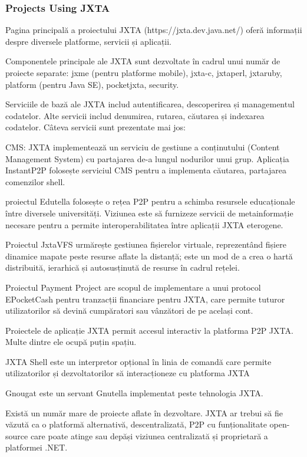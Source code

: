 \subsubsection{Projects Using JXTA}

Pagina principală a proiectului JXTA (https://jxta.dev.java.net/) oferă
informații despre diversele platforme, servicii și aplicații.

Componentele principale ale JXTA sunt dezvoltate în cadrul unui număr de
proiecte separate: jxme (pentru platforme mobile), jxta-c, jxtaperl, jxtaruby,
platform (pentru Java SE), pocketjxta, security.

Serviciile de bază ale JXTA includ autentificarea, descoperirea și
managementul codatelor. Alte servicii includ denumirea, rutarea, căutarea și
indexarea codatelor. Câteva servicii sunt prezentate mai jos:

CMS: JXTA implementează un serviciu de gestiune a conținutului (Content
Management System) cu partajarea de-a lungul nodurilor unui grup. Aplicația
InstantP2P folosește serviciul CMS pentru a implementa căutarea, partajarea
comenzilor shell.

proiectul Edutella folosește o rețea P2P pentru a schimba resursele
educaționale între diversele universități. Viziunea este să furnizeze servicii
de metainformație necesare pentru a permite interoperabilitatea între
aplicații JXTA eterogene.

Proiectul JxtaVFS urmărește gestiunea fișierelor virtuale, reprezentând
fișiere dinamice mapate peste resurse aflate la distanță; este un mod de a
crea o hartă distribuită, ierarhică și autosusținută de resurse în cadrul
rețelei.

Proiectul Payment Project are scopul de implementare a unui protocol
EPocketCash pentru tranzacții financiare pentru JXTA, care permite tuturor
utilizatorilor să devină cumpăratori sau vânzători de pe același cont.

Proiectele de aplicație JXTA permit accesul interactiv la platforma P2P JXTA.
Multe dintre ele ocupă puțin spațiu.

JXTA Shell este un interpretor opțional în linia de comandă care permite
utilizatorilor și dezvoltatorilor să interacționeze cu platforma JXTA

Gnougat este un servant Gnutella implementat peste tehnologia JXTA.

Există un număr mare de proiecte aflate în dezvoltare. JXTA ar trebui să fie
văzută ca o platformă alternativă, descentralizată, P2P cu funționalitate
open-source care poate atinge sau depăși viziunea centralizată și proprietară
a platformei .NET.

